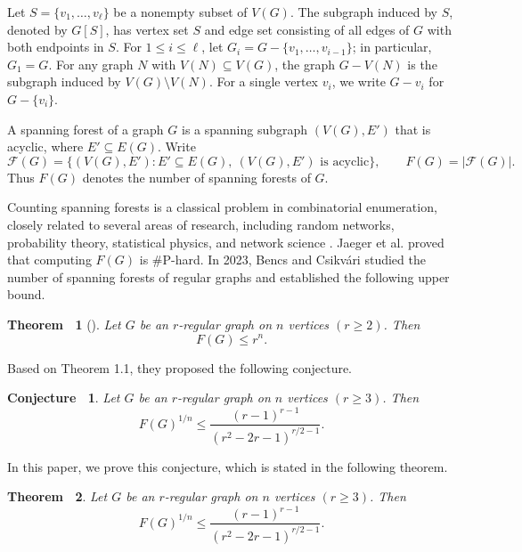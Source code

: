 \documentclass[11pt, a4paper]{article}
\theoremstyle{plain}
\newtheorem{theorem}{ Theorem\ }[section]
\newtheorem{conjecture}{Conjecture\ }[section]
\begin{document}
Let $S=\{v_1, \ldots, v_\ell\}$ be a nonempty subset of $V(G)$.
The subgraph induced by $S$, denoted by $G[S]$, has vertex set $S$ and edge set consisting of all edges of $G$ with both endpoints in $S$.
For $1 \leq i \leq \ell$, let $G_i = G - \{v_1, \ldots, v_{i-1}\}$; in particular, $G_1 = G$.
For any graph $N$ with $V(N) \subseteq V(G)$, the graph $G - V(N)$ is the subgraph induced by $V(G) \setminus V(N)$. For a single vertex $v_i$, we write $G - v_i$ for $G - \{v_i\}$.








A spanning forest of a graph \(G\) is a spanning subgraph \((V(G),E')\) that is acyclic, where \(E'\subseteq E(G)\). Write
\[
\mathcal{F}(G)=
\{(V(G),E'):E'\subseteq E(G),\ (V(G),E')\text{ is acyclic}\},
\qquad F(G)=|\mathcal{F}(G)|.
\]
Thus $F(G)$ denotes the number of spanning forests of $G$.

Counting spanning forests is a classical problem in combinatorial enumeration,
closely related to several areas of research, including random networks, probability theory, statistical physics, and network science \cite{Aldous2007, Annan1994, Borbényi2021, Caracciolo2004, Grimmett2004, Liu1981, Teranishi2005, ke2026}.
Jaeger et al. \cite{Jaeger1990} proved that computing $F(G)$ is \#P-hard.
In 2023, Bencs and Csikvári studied the number of spanning forests of regular graphs and established the following upper bound.
\begin{theorem}[\cite{Bencs2023}]
Let $G$ be an $r$-regular graph on $n$ vertices $(r \geq 2)$. Then
\[
F(G) \leq r^{n}.
\]
\end{theorem}
Based on Theorem 1.1, they proposed the following conjecture.
\begin{conjecture}
Let $G$ be an $r$-regular graph on $n$ vertices $(r \geq 3)$. Then
\[
F(G)^{1/n} \leq \frac{(r - 1)^{r-1}}{(r^2 - 2r - 1)^{r/2-1}}.
\]
\end{conjecture}
In this paper, we prove this conjecture, which is stated in the following theorem.

\begin{theorem}\label{thm2}
Let $G$ be an $r$-regular graph on $n$ vertices $(r \geq 3)$. Then
\[
F(G)^{1/n} \leq \frac{(r - 1)^{r-1}}{(r^2 - 2r - 1)^{r/2-1}}.
\]
\end{theorem}
\end{document}
